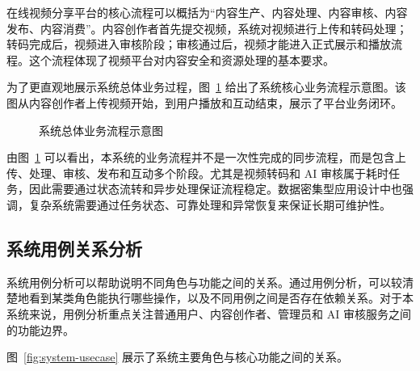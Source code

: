 在线视频分享平台的核心流程可以概括为“内容生产、内容处理、内容审核、内容发布、内容消费”。内容创作者首先提交视频，系统对视频进行上传和转码处理；转码完成后，视频进入审核阶段；审核通过后，视频才能进入正式展示和播放流程。这个流程体现了视频平台对内容安全和资源处理的基本要求。

为了更直观地展示系统总体业务过程，图~\ref{fig:overall-business-flow} 给出了系统核心业务流程示意图。该图从内容创作者上传视频开始，到用户播放和互动结束，展示了平台业务闭环。

\begin{figure}[htbp]
  \centering
  \caption{系统总体业务流程示意图}
  \label{fig:overall-business-flow}
\end{figure}

由图~\ref{fig:overall-business-flow} 可以看出，本系统的业务流程并不是一次性完成的同步流程，而是包含上传、处理、审核、发布和互动多个阶段。尤其是视频转码和 AI 审核属于耗时任务，因此需要通过状态流转和异步处理保证流程稳定。数据密集型应用设计中也强调，复杂系统需要通过任务状态、可靠处理和异常恢复来保证长期可维护性\cite{kleppmann2017ddia}。

\subsection{系统用例关系分析}
\label{subsec:system-usecase-analysis}

系统用例分析可以帮助说明不同角色与功能之间的关系。通过用例分析，可以较清楚地看到某类角色能执行哪些操作，以及不同用例之间是否存在依赖关系。对于本系统来说，用例分析重点关注普通用户、内容创作者、管理员和 AI 审核服务之间的功能边界。

图~\ref{fig:system-usecase} 展示了系统主要角色与核心功能之间的关系。

